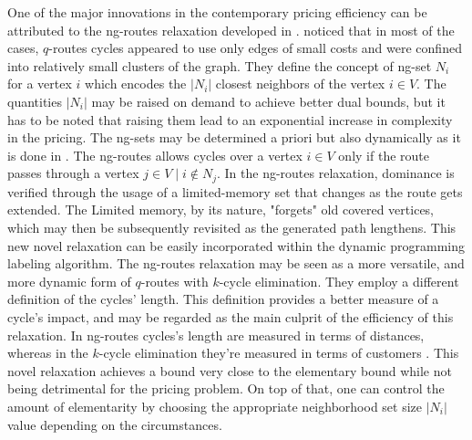 One of the major innovations in the contemporary pricing efficiency
can be attributed to the ng-routes relaxation developed in \textcite{baldacci2011}.
\citeauthor{baldacci2011} noticed that in most of the cases,
$q$-routes cycles appeared to use only edges of small costs
and were confined into relatively small clusters of the graph.
They define the concept of ng-set $N_i$ for a vertex $i$
which encodes the $|N_i|$ closest neighbors of the vertex $i \in V$.
The quantities $|N_i|$ may be raised on demand to achieve better dual bounds,
but it has to be noted that raising them lead to an exponential increase in complexity
in the pricing.
The ng-sets may be determined a priori but also dynamically as it is done in \textcite{roberti2014}.
The ng-routes allows cycles over a vertex $i \in V$ only if the route
passes through a vertex $j \in V \mid i \notin N_j$.
In the ng-routes relaxation,
dominance is verified through the usage of a limited-memory set
that changes as the route gets extended.
The Limited memory, by its nature,
"forgets" old covered vertices,
which may then be subsequently revisited
as the generated path lengthens.
This new novel relaxation can be easily incorporated within the
dynamic programming labeling algorithm.
The ng-routes relaxation may be seen
as a more versatile, and more dynamic form of $q$-routes
with $k$-cycle elimination.
They employ a different definition of the cycles' length.
This definition provides a better measure of a cycle's impact,
and may be regarded as the main culprit of the efficiency of
this relaxation.
In ng-routes cycles's length are measured in terms of distances,
whereas in the $k$-cycle elimination they're measured
in terms of customers \parencite{contardo2014}.
This novel relaxation achieves a bound very close to the elementary bound while
not being detrimental for the pricing problem.
On top of that, one can control
the amount of elementarity by choosing the appropriate neighborhood set size $|N_i|$
value  depending on the circumstances.

\begin{comment}
\parencite{condardo2014}
Irnich and Villeneuve [15] used this observation to develop the so-called SPPRC
with k-cycle elimination (k-cyc-SPPRC),
in which short cycles
(in terms of the number of customers visited between two consecutive appearances of a given node)
are forbidden whereas long cycles (in terms of the same number) are still allowed.
The advantage of the ng-SPPRC with respect to k-cyc-SPPRC is how the length of a cycle is defined.
Indeed, the number of
customers between two appearances of a node may not be the right criterion,
the length of the cycle in terms of distance
being a better measure of the impact of a cycle in the linear relaxation lower bound.
The ng-SPPRC thus forbids cycles that
are short with respect to the time consumption regardless of
the number of nodes between two appearences of a given customer.
\end{comment}


